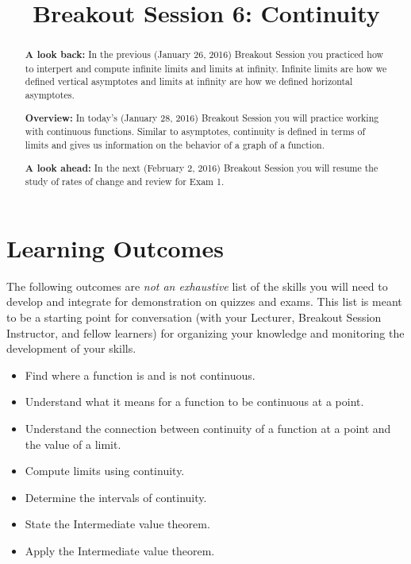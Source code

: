 \documentclass[handout,nooutcomes]{ximera}
\title{Breakout Session 6: Continuity}
\begin{document}
\begin{abstract}
  \textbf{A look back:} In the previous (January 26, 2016) Breakout Session you practiced how to interpert and compute infinite limits and limits at infinity.
  Infinite limits are how we defined vertical asymptotes and limits at infinity are how we defined horizontal asymptotes.

  \textbf{Overview:} In today's (January 28, 2016) Breakout Session you will practice working with continuous functions.
  Similar to asymptotes, continuity is defined in terms of limits and gives us information on the behavior of a graph of a function.

  \textbf{A look ahead:} In the next (February 2, 2016) Breakout Session you will resume the study of rates of change and review for Exam 1.
\end{abstract}
\maketitle

\section{Learning Outcomes}
\label{section:learning-outcomes}
The following outcomes are \emph{not an exhaustive} list of the skills you will need to develop and integrate for demonstration on quizzes and exams.
This list is meant to be a starting point for conversation (with your Lecturer, Breakout Session Instructor, and fellow learners) for organizing your knowledge and monitoring the development of your skills.
\begin{itemize}
  \item 
    Find where a function is and is not continuous.

  \item 
    Understand what it means for a function to be continuous at a point.

  \item
    Understand the connection between continuity of a function at a point and the value of a limit.

  \item
    Compute limits using continuity.

  \item
    Determine the intervals of continuity.

  \item
    State the Intermediate value theorem.

  \item 
    Apply the Intermediate value theorem.
\end{itemize}
\end{document}
